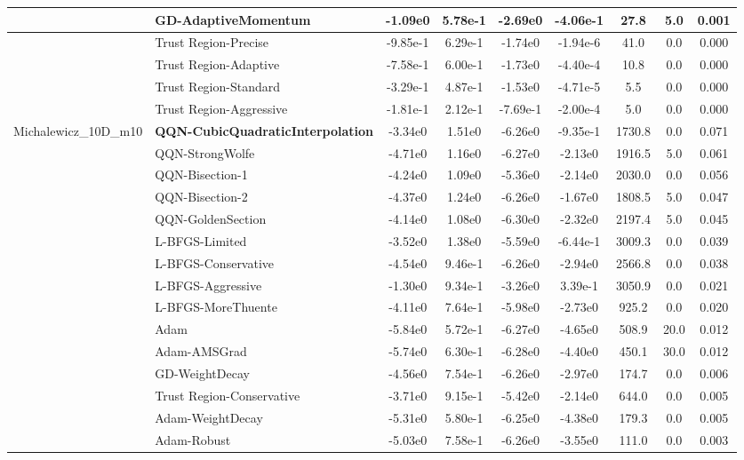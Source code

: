 \documentclass[10pt]{article}
\begin{document}
\begin{longtable}{|l|l|c|c|c|c|c|c|c|}
\hline
 & GD-AdaptiveMomentum & -1.09e0 & 5.78e-1 & -2.69e0 & -4.06e-1 & 27.8 & 5.0 & 0.001 \\
\hline
 & Trust Region-Precise & -9.85e-1 & 6.29e-1 & -1.74e0 & -1.94e-6 & 41.0 & 0.0 & 0.000 \\
\hline
 & Trust Region-Adaptive & -7.58e-1 & 6.00e-1 & -1.73e0 & -4.40e-4 & 10.8 & 0.0 & 0.000 \\
\hline
 & Trust Region-Standard & -3.29e-1 & 4.87e-1 & -1.53e0 & -4.71e-5 & 5.5 & 0.0 & 0.000 \\
\hline
 & Trust Region-Aggressive & -1.81e-1 & 2.12e-1 & -7.69e-1 & -2.00e-4 & 5.0 & 0.0 & 0.000 \\
Michalewicz\_10D\_m10 & \textbf{QQN-CubicQuadraticInterpolation} & -3.34e0 & 1.51e0 & -6.26e0 & -9.35e-1 & 1730.8 & 0.0 & 0.071 \\
\hline
 & QQN-StrongWolfe & -4.71e0 & 1.16e0 & -6.27e0 & -2.13e0 & 1916.5 & 5.0 & 0.061 \\
\hline
 & QQN-Bisection-1 & -4.24e0 & 1.09e0 & -5.36e0 & -2.14e0 & 2030.0 & 0.0 & 0.056 \\
\hline
 & QQN-Bisection-2 & -4.37e0 & 1.24e0 & -6.26e0 & -1.67e0 & 1808.5 & 5.0 & 0.047 \\
\hline
 & QQN-GoldenSection & -4.14e0 & 1.08e0 & -6.30e0 & -2.32e0 & 2197.4 & 5.0 & 0.045 \\
\hline
 & L-BFGS-Limited & -3.52e0 & 1.38e0 & -5.59e0 & -6.44e-1 & 3009.3 & 0.0 & 0.039 \\
\hline
 & L-BFGS-Conservative & -4.54e0 & 9.46e-1 & -6.26e0 & -2.94e0 & 2566.8 & 0.0 & 0.038 \\
\hline
 & L-BFGS-Aggressive & -1.30e0 & 9.34e-1 & -3.26e0 & 3.39e-1 & 3050.9 & 0.0 & 0.021 \\
\hline
 & L-BFGS-MoreThuente & -4.11e0 & 7.64e-1 & -5.98e0 & -2.73e0 & 925.2 & 0.0 & 0.020 \\
\hline
 & Adam & -5.84e0 & 5.72e-1 & -6.27e0 & -4.65e0 & 508.9 & 20.0 & 0.012 \\
\hline
 & Adam-AMSGrad & -5.74e0 & 6.30e-1 & -6.28e0 & -4.40e0 & 450.1 & 30.0 & 0.012 \\
\hline
 & GD-WeightDecay & -4.56e0 & 7.54e-1 & -6.26e0 & -2.97e0 & 174.7 & 0.0 & 0.006 \\
\hline
 & Trust Region-Conservative & -3.71e0 & 9.15e-1 & -5.42e0 & -2.14e0 & 644.0 & 0.0 & 0.005 \\
\hline
 & Adam-WeightDecay & -5.31e0 & 5.80e-1 & -6.25e0 & -4.38e0 & 179.3 & 0.0 & 0.005 \\
\hline
 & Adam-Robust & -5.03e0 & 7.58e-1 & -6.26e0 & -3.55e0 & 111.0 & 0.0 & 0.003 \\

\end{longtable}
\end{document}
